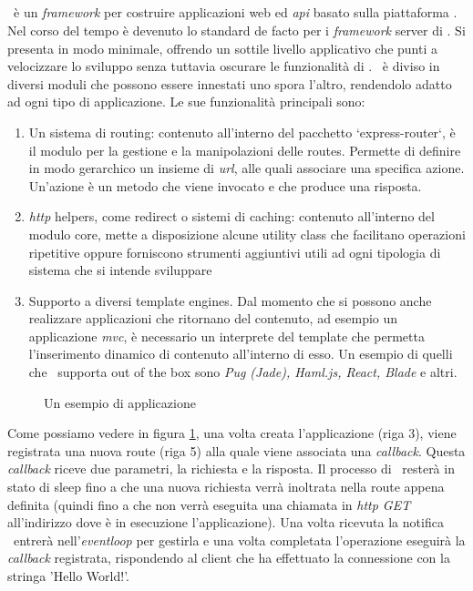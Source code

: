\subsection{\expressjs}
\expressjs~è un \textit{\gls{framework}} per costruire applicazioni web ed \textit{\acrshort{api}} basato sulla piattaforma \nodejs. Nel corso del tempo è devenuto lo standard de facto per i \textit{\gls{framework}} server di \nodejs. 
Si presenta in modo minimale, offrendo un sottile livello applicativo che punti a velocizzare lo sviluppo senza tuttavia oscurare le funzionalità di \nodejs. \expressjs~è diviso in diversi moduli che possono essere innestati uno spora l'altro, rendendolo adatto ad ogni tipo di applicazione.  
Le sue funzionalità principali sono:
\begin{enumerate}[label=(\alph*)]
	\item Un sistema di routing: contenuto all'interno del pacchetto `express-router`, è il modulo per la gestione e la manipolazioni delle routes. Permette di definire in modo gerarchico un insieme di \textit{\acrshort{url}}, alle quali associare una specifica azione. Un'azione è un metodo che viene invocato e che produce una risposta.
	\item \textit{\acrshort{http}} helpers, come redirect o sistemi di caching: contenuto all'interno del modulo core, mette a disposizione alcune utility class che facilitano operazioni ripetitive oppure forniscono strumenti aggiuntivi utili ad ogni tipologia di sistema che si intende sviluppare
	\item Supporto a diversi template engines. Dal momento che si possono anche realizzare applicazioni che ritornano del contenuto, ad esempio un applicazione \textit{\gls{mvc}}, è necessario un interprete del template che permetta l'inserimento dinamico di contenuto all'interno di esso. Un esempio di quelli che \expressjs~supporta out of the box sono \textit{Pug (Jade), Haml.js, React, Blade} e altri.
\end{enumerate}
\begin{figure}[!h] 
	\centering    
	
	\caption[Esempio di applicazione \expressjs]{Un esempio di applicazione \expressjs}
	\label{fig:expressjs-example}
\end{figure}
Come possiamo vedere in figura \ref{fig:expressjs-example}, una volta creata l'applicazione (riga 3), viene registrata una nuova route (riga 5) alla quale viene associata una \textit{\gls{callback}}. Questa \textit{\gls{callback}} riceve due parametri, la richiesta e la risposta. Il processo di \nodejs~resterà in stato di sleep fino a che una nuova richiesta verrà inoltrata nella route appena definita (quindi fino a che non verrà eseguita una chiamata in \textit{\acrshort{http} GET} all'indirizzo dove è in esecuzione l'applicazione). Una volta ricevuta la notifica \nodejs~entrerà nell'\textit{\gls{eventloop}} per gestirla e una volta completata l'operazione eseguirà la \textit{\gls{callback}} registrata, rispondendo al client che ha effettuato la connessione con la stringa 'Hello World!'.

